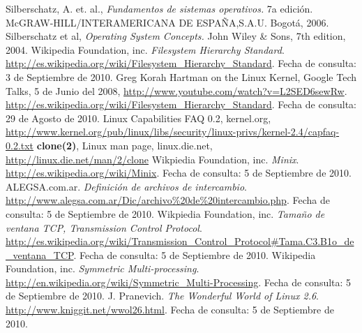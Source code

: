 \documentclass[spanish]{article}
\begin{document}
\clearpage
{}
\begin{thebibliography}{99}
Silberschatz, A. et. al., \textit{Fundamentos de sistemas operativos.} 7a edición. McGRAW-HILL/INTERAMERICANA DE ESPAÑA,S.A.U. Bogotá, 2006. 
Silberschatz et al, \textit{Operating System Concepts.} John Wiley \& Sons, 7th edition, 2004. 
 Wikipedia Foundation, inc. \textit{Filesystem Hierarchy Standard}. \url{http://es.wikipedia.org/wiki/Filesystem_Hierarchy_Standard}. Fecha de consulta: 3 de Septiembre de 2010.
 Greg Korah Hartman on the Linux Kernel, Google Tech Talks, 5 de Junio del 2008, \url{http://www.youtube.com/watch?v=L2SED6sewRw}.
\url{http://es.wikipedia.org/wiki/Filesystem_Hierarchy_Standard}. Fecha de consulta: 29 de Agosto de 2010.
 Linux Capabilities FAQ 0.2, kernel.org, \url{http://www.kernel.org/pub/linux/libs/security/linux-privs/kernel-2.4/capfaq-0.2.txt}
 \textbf{clone(2)}, Linux man page, linux.die.net, \url{http://linux.die.net/man/2/clone}
Wikpiedia Foundation, inc. \textit{Minix}. \url{http://es.wikipedia.org/wiki/Minix}. Fecha de consulta: 5 de Septiembre de 2010.  
ALEGSA.com.ar. \textit{Definición de archivos de intercambio}. \url{http://www.alegsa.com.ar/Dic/archivo\%20de\%20intercambio.php}. Fecha de consulta: 5 de Septiembre de 2010.
Wikpiedia Foundation, inc. \textit{Tamaño de ventana TCP, Transmission Control Protocol}. \url{http://es.wikipedia.org/wiki/Transmission_Control_Protocol#Tama.C3.B1o_de_ventana_TCP}. Fecha de consulta: 5 de Septiembre de 2010. 
Wikipedia Foundation, inc. \textit{Symmetric Multi-processing}. \url{http://en.wikipedia.org/wiki/Symmetric_Multi-Processing}. Fecha de consulta: 5 de Septiembre de 2010. 
J. Pranevich. \textit{The Wonderful World of Linux 2.6}. \url{http://www.kniggit.net/wwol26.html}. Fecha de consulta: 5 de Septiembre de 2010.


\end{thebibliography}
\end{document}
